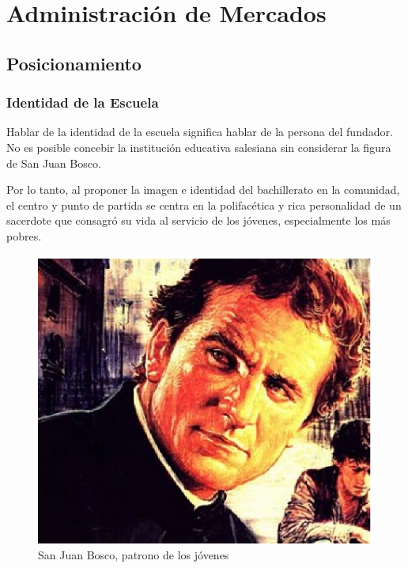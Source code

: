 \chapter{Administración de Mercados}
\label{ch:AdministracionMercados}

\section{Posicionamiento}

\subsection{Identidad de la Escuela}

Hablar de la identidad de la escuela significa hablar de la persona del fundador. No es posible concebir la institución educativa salesiana sin considerar la figura de San Juan Bosco.

Por lo tanto, al proponer la imagen e identidad del bachillerato en la comunidad, el centro y punto de partida se centra en la polifacética y rica personalidad de un sacerdote que consagró su vida al servicio de los jóvenes, especialmente los más pobres.

\begin{figure}
	\centering
	\includegraphics[scale=0.5]{images/san-juan-bosco}
	\caption{San Juan Bosco, patrono de los jóvenes}
	\label{fig:don-bosco}
\end{figure}

